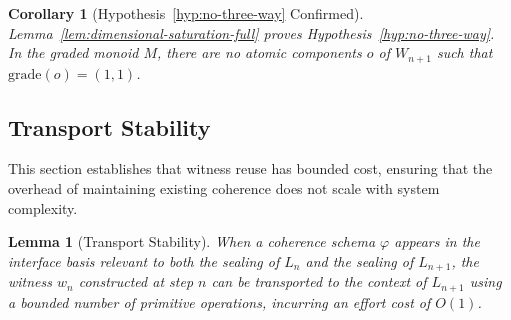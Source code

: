\documentclass[11pt]{article}
\newtheorem{lemma}[theorem]{Lemma}
\newtheorem{corollary}[theorem]{Corollary}
\theoremstyle{definition}
\theoremstyle{remark}
\begin{document}
\begin{corollary}[Hypothesis~\ref{hyp:no-three-way} Confirmed]
\label{cor:no-three-way-confirmed}
Lemma~\ref{lem:dimensional-saturation-full} proves Hypothesis~\ref{hyp:no-three-way}. In the
graded monoid $M$, there are no atomic components $o$ of $W_{n+1}$ such that $\text{grade}(o) = (1, 1)$.
\end{corollary}

\subsection{Transport Stability}
\label{app:transport-stability}

This section establishes that witness reuse has bounded cost, ensuring that the overhead of
maintaining existing coherence does not scale with system complexity.

\begin{lemma}[Transport Stability]
\label{lem:transport-stability-full}
When a coherence schema $\varphi$ appears in the interface basis relevant to both the sealing of $L_n$
and the sealing of $L_{n+1}$, the witness $w_n$ constructed at step $n$ can be transported to the
context of $L_{n+1}$ using a bounded number of primitive operations, incurring an effort cost of $O(1)$.
\end{lemma}
\end{document}
